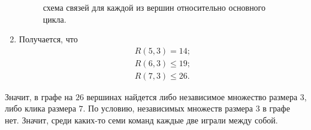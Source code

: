 \begin{solution}
\begin{enumerate}
\begin{figure}[H]
\begin{subfigure}[a]{0.24\linewidth}
  \end{subfigure}
  \caption{схема связей для каждой из вершин относительно основного цикла.}
\end{figure}

\item
Получается, что
\begin{gather*}
    R(5, 3) = 14;\\
    R(6, 3) \leq 19;\\
    R(7, 3) \leq 26.
\end{gather*}
\end{enumerate}
Значит, в графе на $26$ вершинах найдется либо независимое множество размера $3$, либо клика размера $7$. По условию, независимых множеств размера $3$ в графе нет. Значит, среди каких-то семи команд каждые две играли между собой.
\end{solution}